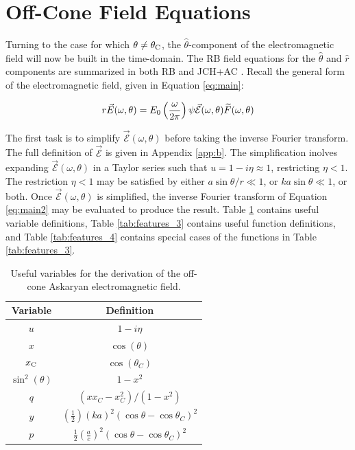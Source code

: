 \documentclass[amsmath,amssymb,aps,prd,10pt,twocolumn]{revtex4}
\begin{document}
\section{Off-Cone Field Equations}
\label{sec:ofc}

Turning to the case for which $\theta \neq \theta_{\rm C}$, the $\hat{\theta}$-component of the electromagnetic field  will now be built in the time-domain.  The RB field equations for the $\hat{\theta}$ and $\hat{r}$ components are summarized in both RB and JCH+AC \cite{10.1103/physrevd.65.016003,10.1016/j.astropartphys.2017.03.008}.  Recall the general form of the electromagnetic field, given in Equation \ref{eq:main}:

\begin{equation}
r\vec{E}(\omega,\theta) = E_{\rm 0} \left( \frac{\omega}{2\pi} \right) \psi \vec{\mathcal{E}}(\omega,\theta) \widetilde{F}(\omega,\theta) \label{eq:main2}
\end{equation}

The first task is to simplify $\vec{\mathcal{E}}(\omega,\theta)$ before taking the inverse Fourier transform.  The full definition of $\vec{\mathcal{E}}$ is given in Appendix \ref{app:b}. The simplification inolves expanding $\vec{\mathcal{E}}(\omega,\theta)$ in a Taylor series such that $u = 1-i\eta \approx 1$, restricting $\eta < 1$.  The restriction $\eta < 1$ may be satisfied by either $a\sin\theta/r \ll 1$, or $k a \sin\theta \ll 1$, or both. Once $\vec{\mathcal{E}}(\omega,\theta)$ is simplified, the inverse Fourier transform of Equation \ref{eq:main2} may be evaluated to produce the result.  Table \ref{tab:features_2} contains useful variable definitions, Table \ref{tab:features_3} contains useful function definitions, and Table \ref{tab:features_4} contains special cases of the functions in Table \ref{tab:features_3}.

\begin{table}
\renewcommand{\arraystretch}{1.5}
\begin{tabular}{| c | c |} \hline
Variable & Definition \\ \hline
$u$ & $1-i\eta$ \\
$x$ & $\cos(\theta)$ \\
$x_{\rm C}$ & $\cos(\theta_C)$ \\
$\sin^2(\theta)$ & $1 - x^2$ \\
$q$ & $(x x_C - x^2_C)/(1-x^2)$ \\
$y$ & $\left( \frac{1}{2} \right) (ka)^2 (\cos\theta - \cos\theta_C)^2$ \\
$p$ & $\frac{1}{2}\left(\frac{a}{c}\right)^2 \left(\cos\theta - \cos\theta_C\right)^2$ \\ \hline
\end{tabular}
\caption{\label{tab:features_2} Useful variables for the derivation of the off-cone Askaryan electromagnetic field.}
\end{table}
\end{document}
